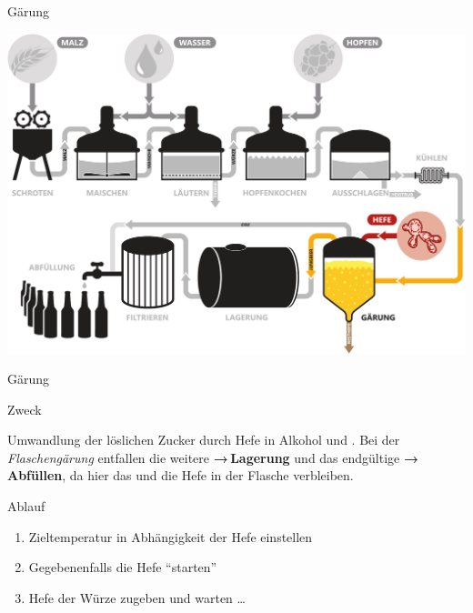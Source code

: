 \documentclass[9pt, ngerman]{beamer}
\newcommand{\forward}[1]{\textbf{→\,#1}}
\begin{document}
\begin{frame}{Gärung}
  \begin{center}
    \vspace{0.5cm}
    \includegraphics[width=\textwidth]{pdfs/prozess-gaerung.pdf}
  \end{center}
\end{frame}
\begin{frame}{Gärung}
  \begin{block}{Zweck}
    \vspace{0.5em}

    Umwandlung der löslichen Zucker durch Hefe in Alkohol und . Bei der
    \emph{Flaschengärung} entfallen die weitere \forward{Lagerung} und das
    endgültige \forward{Abfüllen}, da hier das  und die Hefe in der
    Flasche verbleiben.

  \end{block}

  \begin{block}{Ablauf}
    \begin{enumerate}
      \item Zieltemperatur in Abhängigkeit der Hefe einstellen
      \item Gegebenenfalls die Hefe \enquote{starten}
      \item Hefe der Würze zugeben und warten \dots
    \end{enumerate}
  \end{block}
\end{frame}
\end{document}
